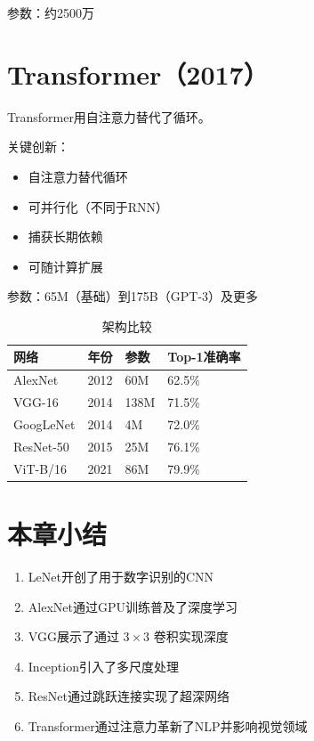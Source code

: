 参数：约2500万

\section{Transformer（2017）}

Transformer用自注意力替代了循环。

关键创新：
\begin{itemize}
    \item 自注意力替代循环
    \item 可并行化（不同于RNN）
    \item 捕获长期依赖
    \item 可随计算扩展
\end{itemize}

参数：65M（基础）到175B（GPT-3）及更多

\begin{table}[h]
    \centering
    \caption{架构比较}
    \begin{tabular}{L{2.5cm} L{2cm} L{2.5cm} L{2.5cm}}
        \toprule
        \textbf{网络} & \textbf{年份} & \textbf{参数} & \textbf{Top-1准确率} \\
        \midrule
        AlexNet & 2012 & 60M & 62.5\% \\
        VGG-16 & 2014 & 138M & 71.5\% \\
        GoogLeNet & 2014 & 4M & 72.0\% \\
        ResNet-50 & 2015 & 25M & 76.1\% \\
        ViT-B/16 & 2021 & 86M & 79.9\% \\
        \bottomrule
    \end{tabular}
\end{table}

\section{本章小结}

\begin{enumerate}
    \item LeNet开创了用于数字识别的CNN
    \item AlexNet通过GPU训练普及了深度学习
    \item VGG展示了通过 $3\times3$ 卷积实现深度
    \item Inception引入了多尺度处理
    \item ResNet通过跳跃连接实现了超深网络
    \item Transformer通过注意力革新了NLP并影响视觉领域
\end{enumerate}
